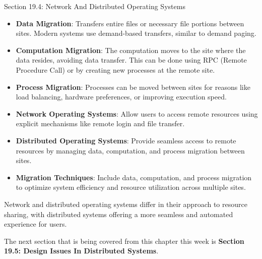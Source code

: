 \begin{notes}{Section 19.4: Network And Distributed Operating Systems}
\begin{highlight}
        \begin{itemize}
            \item \textbf{Data Migration}: Transfers entire files or necessary file portions between sites. Modern systems use demand-based transfers, similar to demand paging.
            \item \textbf{Computation Migration}: The computation moves to the site where the data resides, avoiding data transfer. This can be done using RPC (Remote Procedure Call) or by creating 
            new processes at the remote site.
            \item \textbf{Process Migration}: Processes can be moved between sites for reasons like load balancing, hardware preferences, or improving execution speed.
        \end{itemize}
    
    \end{highlight}
    
    \begin{highlight}
    
        \begin{itemize}
            \item \textbf{Network Operating Systems}: Allow users to access remote resources using explicit mechanisms like remote login and file transfer.
            \item \textbf{Distributed Operating Systems}: Provide seamless access to remote resources by managing data, computation, and process migration between sites.
            \item \textbf{Migration Techniques}: Include data, computation, and process migration to optimize system efficiency and resource utilization across multiple sites.
        \end{itemize}
    
    Network and distributed operating systems differ in their approach to resource sharing, with distributed systems offering a more seamless and automated experience for users.
    
    \end{highlight}
\end{notes}

The next section that is being covered from this chapter this week is \textbf{Section 19.5: Design Issues In Distributed Systems}.

